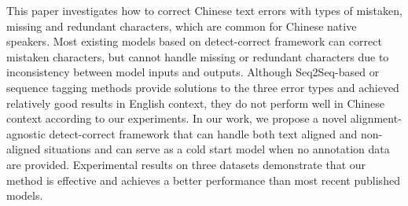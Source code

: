 This paper investigates how to correct Chinese text errors with types of mistaken, missing and redundant characters, which are common for Chinese native speakers. Most existing models based on detect-correct framework can correct mistaken characters, but cannot handle missing or redundant characters due to inconsistency between model inputs and outputs. Although Seq2Seq-based or sequence tagging methods provide solutions to the three error types and achieved relatively good results in English context, they do not perform well in Chinese context according to our experiments. In our work, we propose a novel alignment-agnostic detect-correct framework that can handle both text aligned and non-aligned situations and can serve as a cold start model when no annotation data are provided. Experimental results on three datasets demonstrate that our method is effective and achieves a better performance than most recent published models.
